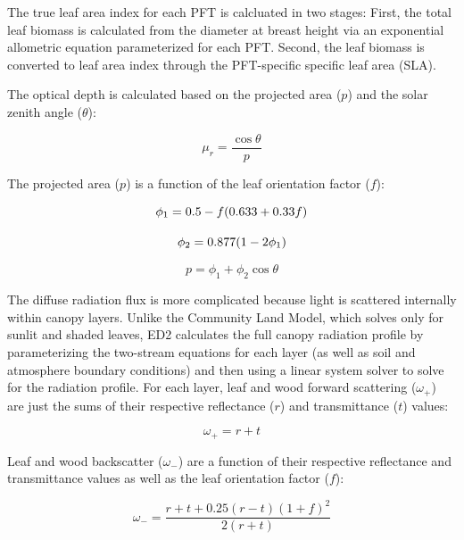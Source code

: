 The true leaf area index for each PFT is calcluated in two stages:
First, the total leaf biomass is calculated from the diameter at breast height via an exponential allometric equation parameterized for each PFT\@.
Second, the leaf biomass is converted to leaf area index through the PFT-specific specific leaf area (SLA).

The optical depth is calculated based on the projected area ($p$) and the solar zenith angle ($\theta$):

\begin{equation}
  \mu_r = \frac{\cos{\theta}}{p}
\end{equation}

The projected area ($p$) is a function of the leaf orientation factor ($f$):

\begin{equation}\label{eq:phi1}
  \phi_1 = 0.5 - f (0.633 + 0.33 f) \\
\end{equation}

\begin{equation}\label{eq:phi2}
  \phi_2 = 0.877 (1 - 2 \phi_1) \\
\end{equation}

\begin{equation}
  p = \phi_1 + \phi_2 \cos{\theta} 
\end{equation}

The diffuse radiation flux is more complicated because light is scattered internally within canopy layers.
Unlike the Community Land Model, which solves only for sunlit and shaded leaves,
ED2 calculates the full canopy radiation profile by parameterizing the two-stream equations for each layer (as well as soil and atmosphere boundary conditions)
and then using a linear system solver to solve for the radiation profile.
For each layer, leaf and wood forward scattering ($\omega_+$) are just the sums of their respective reflectance ($r$) and transmittance ($t$) values:

\begin{equation}
   \omega_+ = r + t 
\end{equation}

Leaf and wood backscatter ($\omega_-$) are a function of their respective reflectance and transmittance values as well as the leaf orientation factor ($f$):

\begin{equation}\label{eq:backscatter_leaf}
   \omega_- = \frac{r + t + 0.25 (r - t) {(1 + f)} ^ 2}{2 (r + t)} 
\end{equation}


